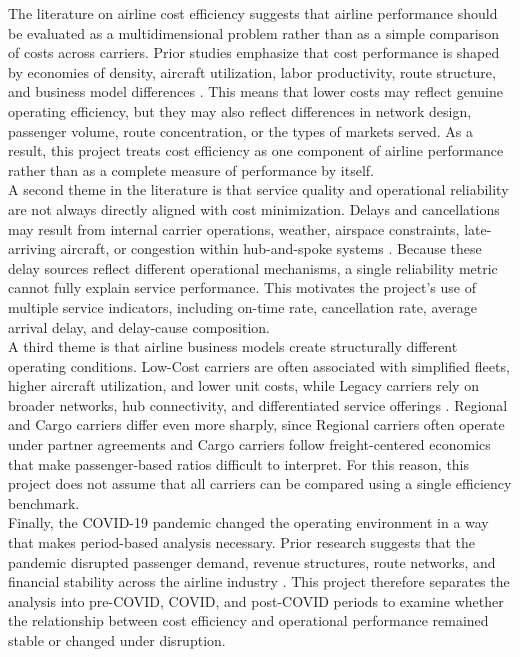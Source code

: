 \documentclass[11pt, letterpaper]{article}
\begin{document}
The literature on airline cost efficiency suggests that airline performance should be evaluated as a multidimensional problem rather than as a simple comparison of costs across carriers. Prior studies emphasize that cost performance is shaped by economies of density, aircraft utilization, labor productivity, route structure, and business model differences \cite{Banker1993,Barbot2008,Caves1984,Zuidberg2014}. This means that lower costs may reflect genuine operating efficiency, but they may also reflect differences in network design, passenger volume, route concentration, or the types of markets served. As a result, this project treats cost efficiency as one component of airline performance rather than as a complete measure of performance by itself. \\
\indent A second theme in the literature is that service quality and operational reliability are not always directly aligned with cost minimization. Delays and cancellations may result from internal carrier operations, weather, airspace constraints, late-arriving aircraft, or congestion within hub-and-spoke systems \cite{Lee2023,MayerSinai2002}. Because these delay sources reflect different operational mechanisms, a single reliability metric cannot fully explain service performance. This motivates the project's use of multiple service indicators, including on-time rate, cancellation rate, average arrival delay, and delay-cause composition. \\
\indent A third theme is that airline business models create structurally different operating conditions. Low-Cost carriers are often associated with simplified fleets, higher aircraft utilization, and lower unit costs, while Legacy carriers rely on broader networks, hub connectivity, and differentiated service offerings \cite{GillenLall2004,Gillen2005,OConnell2005}. Regional and Cargo carriers differ even more sharply, since Regional carriers often operate under partner agreements and Cargo carriers follow freight-centered economics that make passenger-based ratios difficult to interpret. For this reason, this project does not assume that all carriers can be compared using a single efficiency benchmark. \\
\indent Finally, the COVID-19 pandemic changed the operating environment in a way that makes period-based analysis necessary. Prior research suggests that the pandemic disrupted passenger demand, revenue structures, route networks, and financial stability across the airline industry \cite{FontanetPerez2022,Kaya2023,Gudmundsson2021}. This project therefore separates the analysis into pre-COVID, COVID, and post-COVID periods to examine whether the relationship between cost efficiency and operational performance remained stable or changed under disruption.
\end{document}
